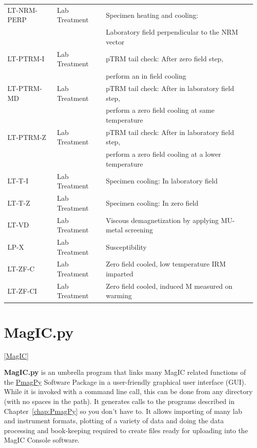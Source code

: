 \documentclass[11pt]{book}
\begin{document}
{\begin{tabular}{lll}
LT-NRM-PERP \qquad & Lab Treatment \qquad & Specimen heating and cooling: \\
\qquad &\qquad &Laboratory field perpendicular to the NRM vector\\
LT-PTRM-I \qquad & Lab Treatment \qquad & pTRM tail check: After zero field step, \\
\qquad &\qquad &perform an in field cooling\\
LT-PTRM-MD \qquad & Lab Treatment \qquad & pTRM tail check: After in laboratory field step, \\
\qquad &\qquad &perform a zero field cooling at same temperature\\
LT-PTRM-Z \qquad & Lab Treatment \qquad & pTRM tail check: After in laboratory field step,\\
\qquad &\qquad & perform a zero field cooling at a lower temperature\\
LT-T-I \qquad & Lab Treatment \qquad & Specimen cooling: In laboratory field\\
LT-T-Z \qquad & Lab Treatment \qquad & Specimen cooling: In zero field\\
LT-VD \qquad & Lab Treatment \qquad & Viscous demagnetization by applying MU-metal screening\\
LP-X \qquad & Lab Treatment \qquad & Susceptibility\\
LT-ZF-C \qquad & Lab Treatment \qquad & Zero field cooled, low temperature IRM imparted\\
LT-ZF-CI \qquad & Lab Treatment \qquad & Zero field cooled, induced M measured on warming\\
\hline
\end{tabular}

  
\chapter{MagIC.py}
\label{chap:MagIC} \href{#MagIC}{[MagIC}]

 {\bf MagIC.py}  is an umbrella program that links many MagIC related functions of the \href{#PmagPy}{PmagPy} Software Package in a user-friendly  graphical user interface (GUI).  While it is invoked with a command line call, this  can be done from any directory (with no spaces in the path).  It generates calls to the programs described in Chapter~\ref{chap:PmagPy} so you don't have to.    It allows importing of many lab and instrument formats, plotting of a variety of data and doing the data processing and book-keeping required to create files ready for uploading into the MagIC Console software.  

}
\end{document}
